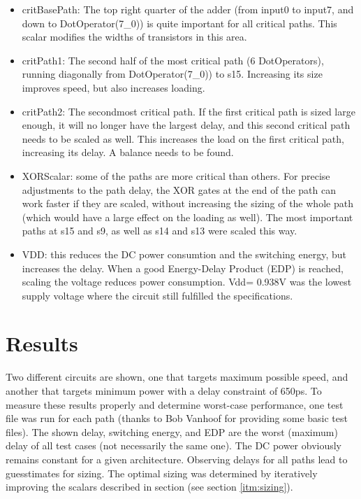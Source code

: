 \documentclass[english]{article}
\begin{document}
\begin{enumerate}
\begin{itemize}
\item critBasePath: The top right quarter of the adder (from input0 to input7, and down to DotOperator(7\_0)) is quite important for all critical paths. This scalar modifies the widths of transistors in this area.

\item critPath1: The second half of the most critical path (6 DotOperators), running diagonally from DotOperator(7\_0)) to s15. Increasing its size improves speed, but also increases loading.

\item critPath2: The secondmost critical path. If the first critical path is sized large enough, it will no longer have the largest delay, and this second critical path needs to be scaled as well. This increases the load on the first critical path, increasing its delay. A balance needs to be found.

\item XORScalar: some of the paths are more critical than others. For precise adjustments to the path delay, the XOR gates at the end of the path can work faster if they are scaled, without increasing the sizing of the whole path (which would have a large effect on the loading as well). The most important paths at s15 and s9, as well as s14 and s13 were scaled this way.

\item VDD: this reduces the DC power consumtion and the switching energy, but increases the delay. When a good Energy-Delay Product (EDP) is reached, scaling the voltage reduces power consumption. Vdd= 0.938V was the lowest supply voltage where the circuit still fulfilled the specifications.

\end{itemize} %

\end{enumerate} %



\section{Results} \label{sec:Results}
Two different circuits are shown, one that targets maximum possible speed, and another that targets minimum power with a delay constraint of 650ps.
To measure these results properly and determine worst-case performance, one test file was run for each path (thanks to Bob Vanhoof for providing some basic test files). 
The shown delay, switching energy, and EDP are the worst (maximum) delay of all test cases (not necessarily the same one). The DC power obviously remains constant for a given architecture.
Observing delays for all paths lead to guesstimates for sizing. The optimal sizing was determined by iteratively improving the scalars described in section (see section \ref{itm:sizing}).
\end{document}
